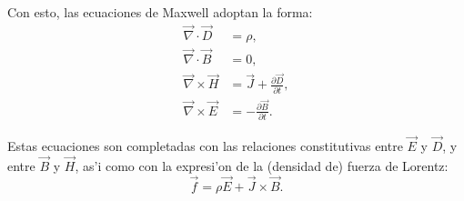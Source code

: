 Con esto, las ecuaciones de Maxwell adoptan la forma:
\begin{align}
\vec\nabla\cdot\vec{D} & =\rho ,\label{max1}\\
\vec\nabla\cdot\vec{B}  & =0 ,\label{max2}\\
\vec\nabla\times\vec{H}  & =\vec{J}+\frac{\partial\vec{D}}{\partial
t} ,\label{max3}\\
\vec\nabla\times\vec{E}  & =-\frac{\partial\vec{B}}{\partial t}.\label{max4}%
\end{align}

Estas ecuaciones son completadas con las relaciones constitutivas entre
$\vec{E}$ y $\vec{D}$, y entre $\vec{B}$ y $\vec{H}$, as'i como con la expresi'on de la (densidad de) fuerza de Lorentz:
\begin{equation}
\vec{f}=\rho\vec{E}+\vec{J}\times\vec{B}.
\end{equation}

